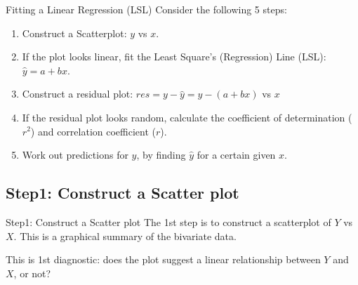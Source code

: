 \documentclass[t,xcolor=pdftex,dvipsnames,table]{beamer}
\begin{document}
\begin{frame}[fragile]{Fitting a Linear Regression (LSL)}
Consider the following 5 steps:  
\begin{enumerate}

\item 
Construct a Scatterplot: $y$ vs $x$.

\item
If the plot looks linear, fit the Least Square’s (Regression) Line (LSL): $\hat{y} = a + b x$. 

\item
Construct a residual plot: $res= y-\hat{y} = y-(a+bx)$ vs $x$

\item
If the residual plot looks random, calculate the coefficient of determination ($r^2$) and correlation coefficient ($r$).

\item
Work out predictions for $y$, by finding $\hat{y}$ for a certain given $x$.
\end{enumerate}
\end{frame}


\subsection[]{Step1: Construct a Scatter plot}
\begin{frame}[fragile]{Step1: Construct a Scatter plot}
The 1st step is to construct a scatterplot of $Y$ vs $X$. This is a graphical summary of the bivariate data.

\vspace{.5cm}
This is 1st diagnostic: does the plot suggest a linear relationship between $Y$ and $X$, or not?
\end{frame}
\end{document}
